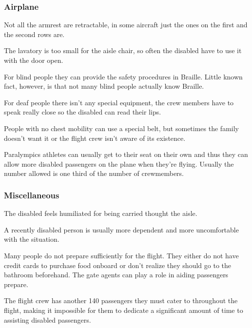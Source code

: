 \documentclass[a4paper, 12pt,conference]{new_cit_thesis}
\begin{document}
\subsubsection{Airplane}
\begin{list}{-}{}
  \item Not all the armrest are retractable, in some aircraft just the ones on the first and the second rows are.
  \item The lavatory is too small for the aisle chair, so often the disabled have to use it with the door open.
  \item For blind people they can provide the safety procedures in Braille. Little known fact, however, is that not many blind people actually know Braille.
  \item For deaf people there isn’t any special equipment, the crew members have to speak really close so the disabled can read their lips. 
  \item People with no chest mobility can use a special belt, but sometimes the family doesn’t want it or the flight crew isn’t aware of its existence.
  \item Paralympics athletes can usually get to their seat on their own and thus they can allow more disabled passengers on the plane when they’re flying. Usually the number allowed is one third of the number of crewmembers.
\end{list}

\subsubsection{Miscellaneous}
\begin{list}{-}{}
  \item The disabled feels humiliated for being carried thought the aisle.
  \item A recently disabled person is usually more dependent and more uncomfortable with the situation.
  \item Many people do not prepare sufficiently for the flight. They either do not have credit cards to purchase food onboard or don’t realize they should go to the bathroom beforehand. The gate agents can play a role in aiding passengers prepare. 
  \item The flight crew has another 140 passengers they must cater to throughout the flight, making it impossible for them to dedicate a significant amount of time to assisting disabled passengers.
\end{list}
\end{document}
